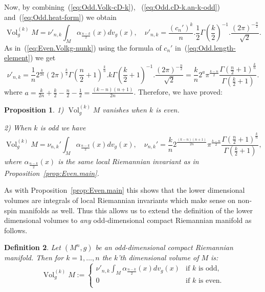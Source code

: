 \documentclass[leqno, 10pt]{amsart}
\newtheorem{definition}{Definition}[section]
\newtheorem{proposition}[definition]{Proposition}
\theoremstyle{remark}
\begin{document}
Now, by combining~(\ref{eq:Odd.Volk-cD-k}), ~(\ref{eq:Odd.cD-k.an-k-odd}) and~(\ref{eq:Odd.heat-form}) we obtain
\begin{equation}
    {{\operatorname{{Vol}}}}^{(k)}_{g}M= \nu'_{n,k}\int_{M}\alpha_{\frac{n-k}{2}}(x)dv_{g}(x), 
    \quad \nu'_{n,k}= \frac{(c_{n}')^{k}}{n}.\frac{1}{2}\Gamma(\frac{k}{2})^{-1}.\frac{(2\pi)^{-\frac{n}{2}}}{\sqrt{2}}.
\end{equation}
As in~(\ref{eq:Even.Volkg-nunk}) using the formula of $c_{n}'$ in~(\ref{eq:Odd.length-element}) we get
\begin{equation}
 \nu'_{n,k}=  \frac{1}{n}2^{\frac{k}{2n}}(2\pi)^{\frac{k}{2}}\Gamma(\frac{n}{2}+1)^{\frac{k}{n}}.k\Gamma(\frac{k}{2}+1)^{-1}. 
    \frac{(2\pi)^{-\frac{n}{2}}}{\sqrt{2}} 
    =\frac{k}{n}2^{a}\pi^{\frac{k-n}{2}}\frac{\Gamma(\frac{n}{2}+1)^{\frac{k}{n}}}{\Gamma(\frac{k}{2}+1)}.
\end{equation}
where $a=\frac{k}{2n}+\frac{k}{2}-\frac{n}{2}-\frac{1}{2}=\frac{(k-n)(n+1)}{2n}$. Therefore, we have proved: 

\begin{proposition}\label{prop:Odd.main}
1)  ${{\operatorname{{Vol}}}}^{(k)}_{g}M$ vanishes when $k$ is even.\smallskip

2) When $k$ is odd we have
\begin{equation}
    {{\operatorname{{Vol}}}}^{(k)}_{g}M=\nu_{n,k}'\int_{M}\alpha_{\frac{n-k}{2}}(x)dv_{g}(x), \quad 
    \nu_{n,k}'=\frac{k}{n}2^{\frac{(k-n)(n+1)}{2n}}\pi^{\frac{k-n}{2}}\frac{\Gamma(\frac{n}{2}+1)^{\frac{k}{n}}}{\Gamma(\frac{k}{2}+1)},
\end{equation}
where $\alpha_{\frac{n-k}{2}}(x)$ is the same local Riemannian invariant as in Proposition~\ref{prop:Even.main}.
\end{proposition}

As with Proposition~\ref{prop:Even.main} this shows that the lower dimensional volumes are integrals of local Riemannian invariants which make sense 
on non-spin manifolds as well. Thus this allows us to extend the definition of the lower dimensional volumes to 
\emph{any} odd-dimensional compact Riemannian manifold as follows.

\begin{definition}\label{def:Odd.general-def}
Let $(M^{n},g)$ be an odd-dimensional compact Riemannian manifold. Then for $k=1,\ldots,n$ the $k$'th dimensional volume of $M$ is: 
\begin{equation}
     {{\operatorname{{Vol}}}}^{(k)}_{g}M:=\left\{
     \begin{array}{ll}
         \nu'_{n,k}\int_{M}\alpha_{\frac{n-k}{2}}(x)dv_{g}(x) &  \text{if $k$ is odd,}\\
               0 & \text{if $k$ is even.}\\
     \end{array} \right.
     \label{eq:Odd.Volkg-non-spin}
\end{equation}
\end{definition}
\end{document}
